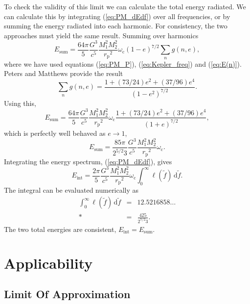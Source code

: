 \documentclass[aps,prd,amsfonts,amssymb,amsmath,reprint,showpacs,groupedaddress]{revtex4-1}
\newcommand{\eqnref}[1]{(\ref{eq:#1})}
\newcommand{\sub}[1]{\ensuremath{_\text{#1}}}
\newcommand{\dd}{\ensuremath{\mathrm{d}}}
\newcommand{\intd}[4]{\ensuremath{\int_{#1}^{#2}{#3}\,\dd{#4}}}
\begin{document}
To check the validity of this limit we can calculate the total energy radiated. We can calculate this by integrating \eqnref{PM_dEdf} over all frequencies, or by summing the energy radiated into each harmonic. For consistency, the two approaches must yield the same result. Summing over harmonics
\begin{equation}
E\sub{sum} = \frac{64\pi}{5}\frac{G^3}{c^5}\frac{M_1^2M_2^2}{r\sub{p}^2}\omega\sub{c}(1-e)^{7/2}\sum_n g(n,e),
\end{equation}
where we have used equations \eqnref{PM_P}, \eqnref{Kepler_freq} and \eqnref{E(n)}. Peters and Matthews\cite{Peters1963} provide the result
\begin{equation}
\sum_n g(n,e) = \frac{1 + (73/24)e^2 + (37/96)e^4}{(1-e^2)^{7/2}}.
\end{equation}
Using this,
\begin{equation}
E\sub{sum} = \frac{64\pi}{5}\frac{G^3}{c^5}\frac{M_1^2M_2^2}{r\sub{p}^2}\omega\sub{c}\frac{1 + (73/24)e^2 + (37/96)e^4}{(1+e)^{7/2}},
\end{equation}
which is perfectly well behaved as $e \rightarrow 1$,
\begin{equation}
E\sub{sum} = \frac{85\pi}{2^{5/2}3}\frac{G^3}{c^5}\frac{M_1^2M_2^2}{r\sub{p}^2}\omega\sub{c}.
\label{eq:PM_total}
\end{equation}
Integrating the energy spectrum, \eqnref{PM_dEdf}, gives
\begin{equation}
E\sub{int} = \frac{2\pi}{5}\frac{G^3}{c^5}\frac{M_1^2M_2^2}{r\sub{p}^2}\omega\sub{c}\intd{0}{\infty}{\ell(\tilde{f})}{\tilde{f}}.
\end{equation}
The integral can be evaluated numerically as
\begin{eqnarray}
\intd{0}{\infty}{\ell(\tilde{f})}{\tilde{f}} & = & 12.5216858\ldots \nonumber \\*
 & = & \frac{425}{2^{7/2}3}.
\end{eqnarray}
The two total energies are consistent, $E\sub{int} = E\sub{sum}$.

\section{Applicability\label{sec:application}}

\subsection{Limit Of Approximation}
\end{document}
